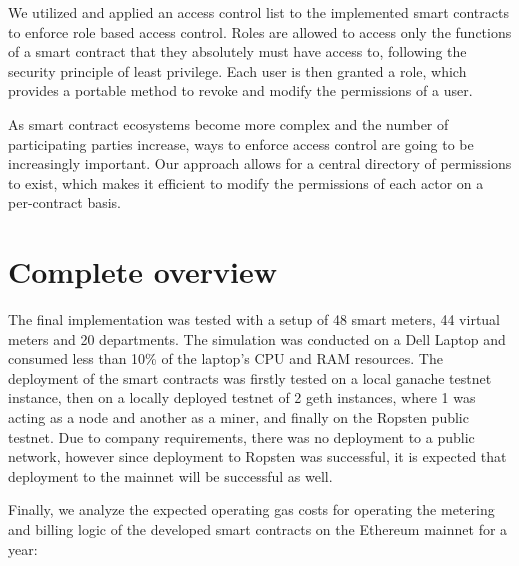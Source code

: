 We utilized and applied an access control list to the implemented smart contracts to enforce role based access control. Roles are allowed to access only the functions of a smart contract that they absolutely must have access to, following the security principle of least privilege. Each user is then granted a role, which provides a portable method to revoke and modify the permissions of a user. 

As smart contract ecosystems become more complex and the number of participating parties increase, ways to enforce access control are going to be increasingly important. Our approach allows for a central directory of permissions to exist, which makes it efficient to modify the permissions of each actor on a per-contract basis. 

\section{Complete overview}
The final implementation was tested with a setup of 48 smart meters, 44 virtual meters and 20 departments. The simulation was conducted on a Dell Laptop and consumed less than 10\% of the laptop's CPU and RAM resources. %
The deployment of the smart contracts was firstly tested on a local ganache testnet instance, then on a locally deployed testnet of 2 geth instances, where 1 was acting as a node and another as a miner, and finally on the Ropsten public testnet. Due to company requirements, there was no deployment to a public network, however since deployment to Ropsten was successful, it is expected that deployment to the mainnet will be successful as well.

Finally, we analyze the expected operating gas costs for operating the metering and billing logic of the developed smart contracts on the Ethereum mainnet for a year:

